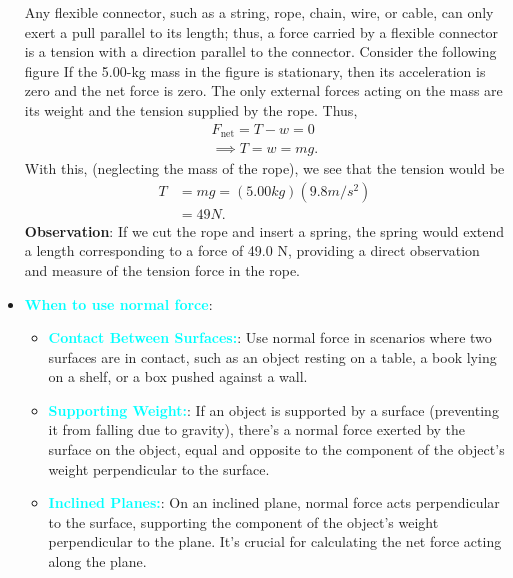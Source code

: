 \documentclass{report}
\begin{document}
\begin{itemize}
                \smallbreak \noindent
                Any flexible connector, such as a string, rope, chain, wire, or cable, can only exert a pull parallel to its length; thus, a force carried by a flexible connector is a tension with a direction parallel to the connector.
                \smallbreak \noindent
                Consider the following figure
                \bigbreak \noindent 
                \bigbreak \noindent 
                If the 5.00-kg mass in the figure is stationary, then its acceleration is zero and the net force is zero. The only external forces acting on the mass are its weight and the tension supplied by the rope. Thus,
                \begin{align*}
                    F_{\text{net}} = T - w = 0 \\
                    \implies  T = w = mg
                .\end{align*}
                With this, (neglecting the mass of the rope), we see that the tension would be
                \begin{align*}
                    T &= mg = (5.00kg)(9.8 m/s^{2}) \\
                    &=49N
                .\end{align*}
                \bigbreak \noindent 
                \textbf{Observation}: If we cut the rope and insert a spring, the spring would extend a length corresponding to a force of 49.0 N, providing a direct observation and measure of the tension force in the rope.
            \item \textbf{\textcolor{cyan}{When to use normal force}}:
                \begin{itemize}
                    \item \textbf{\textcolor{cyan}{Contact Between Surfaces:}}: Use normal force in scenarios where two surfaces are in contact, such as an object resting on a table, a book lying on a shelf, or a box pushed against a wall.
                    \item \textbf{\textcolor{cyan}{Supporting Weight:}}: If an object is supported by a surface (preventing it from falling due to gravity), there's a normal force exerted by the surface on the object, equal and opposite to the component of the object's weight perpendicular to the surface.
                    \item \textbf{\textcolor{cyan}{Inclined Planes:}}: On an inclined plane, normal force acts perpendicular to the surface, supporting the component of the object's weight perpendicular to the plane. It's crucial for calculating the net force acting along the plane.

\end{itemize}
\end{itemize}
\end{document}
